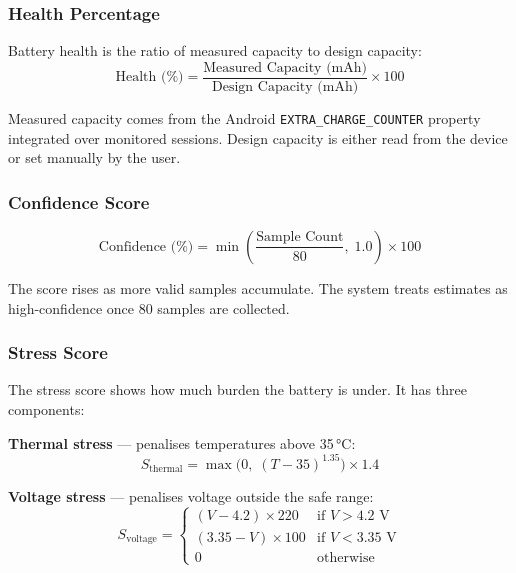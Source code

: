 \documentclass[12pt,a4paper]{report}
\begin{document}
\subsubsection{Health Percentage}

Battery health is the ratio of measured capacity to design capacity:
\begin{equation}
  \text{Health (\%)} = \frac{\text{Measured Capacity (mAh)}}{\text{Design Capacity (mAh)}} \times 100
\end{equation}

Measured capacity comes from the Android \texttt{EXTRA\_CHARGE\_COUNTER}
property integrated over monitored sessions. Design capacity is either read from
the device or set manually by the user.

\subsubsection{Confidence Score}

\begin{equation}
  \text{Confidence (\%)} = \min\!\left(\frac{\text{Sample Count}}{80},\; 1.0\right) \times 100
\end{equation}

The score rises as more valid samples accumulate. The system treats estimates as
high-confidence once 80 samples are collected.

\subsubsection{Stress Score}

The stress score shows how much burden the battery is under. It has three
components:

\textbf{Thermal stress} — penalises temperatures above 35\,°C:
\begin{equation}
  S_{\text{thermal}} = \max\!\bigl(0,\; (T - 35)^{1.35}\bigr) \times 1.4
\end{equation}

\textbf{Voltage stress} — penalises voltage outside the safe range:
\begin{equation}
  S_{\text{voltage}} =
  \begin{cases}
    (V - 4.2) \times 220  & \text{if } V > 4.2\text{ V}\\
    (3.35 - V) \times 100 & \text{if } V < 3.35\text{ V}\\
    0                     & \text{otherwise}
  \end{cases}
\end{equation}
\end{document}
